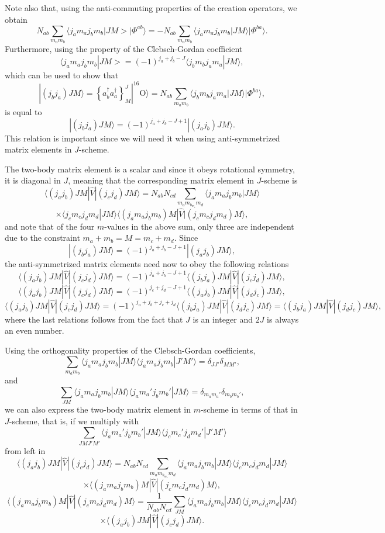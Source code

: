 {Note also that, using the anti-commuting 
properties of the creation operators, we obtain
\[
N_{ab}\sum_{m_am_b}\langle j_am_aj_bm_b|JM>|\Phi^{ab}\rangle=-N_{ab}\sum_{m_am_b}\langle j_am_aj_bm_b|JM\rangle|\Phi^{ba}\rangle.
\]
Furthermore, using the property of the Clebsch-Gordan coefficient
\[
\langle j_am_aj_bm_b|JM>=(-1)^{j_a+j_b-J}\langle j_bm_bj_am_a|JM\rangle,
\]
which can be used to show that
\[
|(j_bj_a)JM\rangle  = \left\{a^{\dagger}_ba^{\dagger}_a\right\}^J_M|^{16}\mathrm{O}\rangle=N_{ab}\sum_{m_am_b}\langle j_bm_bj_am_a|JM\rangle|\Phi^{ba}\rangle, 
\]
is equal to 
\[
|(j_bj_a)JM\rangle=(-1)^{j_a+j_b-J+1}|(j_aj_b)JM\rangle.
\]
This relation is important since we will need it when using anti-symmetrized matrix elements in $J$-scheme.

The two-body matrix element is a scalar and since it obeys rotational symmetry, it is diagonal in $J$, 
meaning that the corresponding matrix element in $J$-scheme is 
\[
\langle (j_aj_b) JM | \hat{V} | (j_cj_d) JM \rangle = N_{ab}N_{cd}\sum_{m_am_b_m_cm_d}\langle j_am_aj_bm_b|JM\rangle
\]
\[\times \langle j_cm_cj_dm_d|JM\rangle\langle (j_am_aj_bm_b)M |  \hat{V} | (j_cm_cj_dm_d)M \rangle,
\]
and note that of the four $m$-values in the above sum, only three are independent due to the constraint $m_a+m_b=M=m_c+m_d$.
Since
\[
|(j_bj_a)JM\rangle=(-1)^{j_a+j_b-J+1}|(j_aj_b)JM\rangle,
\]
the anti-symmetrized matrix elements need now to obey the following relations
\[
\langle (j_aj_b) JM | \hat{V} | (j_cj_d) JM \rangle = (-1)^{j_a+j_b-J+1}\langle (j_bj_a) JM | \hat{V} | (j_cj_d) JM \rangle,
\]
\[
\langle (j_aj_b) JM | \hat{V} | (j_cj_d) JM \rangle = (-1)^{j_c+j_d-J+1}\langle (j_aj_b) JM | \hat{V} | (j_dj_c) JM \rangle,
\]
\[
\langle (j_aj_b) JM | \hat{V} | (j_cj_d) JM \rangle = (-1)^{j_a+j_b+j_c+j_d}\langle (j_bj_a) JM | \hat{V} | (j_dj_c) JM \rangle=\langle (j_bj_a) JM | \hat{V} | (j_dj_c) JM \rangle,
\]
where the last relations follows from the fact that $J$ is an integer and $2J$ is always an even number.

Using the orthogonality properties of the Clebsch-Gordan coefficients,
\[
\sum_{m_am_b}\langle j_am_aj_bm_b|JM\rangle\langle j_am_aj_bm_b|J'M'\rangle=\delta_{JJ'}\delta_{MM'},
\]
and
\[
\sum_{JM}\langle j_am_aj_bm_b|JM\rangle\langle j_am_a'j_bm_b'|JM\rangle=\delta_{m_am_a'}\delta_{m_bm_b'},
\]
we can also express the two-body matrix element in $m$-scheme in terms of that in $J$-scheme, that is, if we multiply with 
\[
\sum_{JMJ'M'}\langle j_am_a'j_bm_b'|JM\rangle\langle j_cm_c'j_dm_d'|J'M'\rangle
\]
from left in
\[
\langle (j_aj_b) JM | \hat{V} | (j_cj_d) JM \rangle = N_{ab}N_{cd}\sum_{m_am_b_m_cm_d}\langle j_am_aj_bm_b|JM\rangle\langle j_cm_cj_dm_d|JM\rangle
\]
\[
\times \langle (j_am_aj_bm_b)M|  \hat{V} | (j_cm_cj_dm_d)M\rangle,
\]
\[
\langle (j_am_aj_bm_b)M |  \hat{V} | (j_cm_cj_dm_d)M\rangle=\frac{1}{N_{ab}N_{cd}}\sum_{JM}\langle j_am_aj_bm_b|JM\rangle\langle j_cm_cj_dm_d|JM\rangle
\]
\[
\times \langle (j_aj_b) JM | \hat{V} | (j_cj_d) JM \rangle.
\]

}
